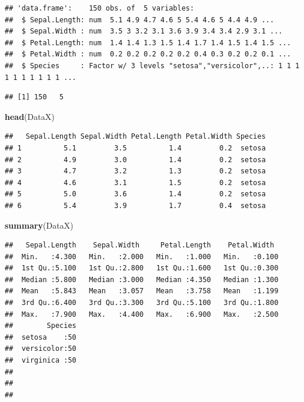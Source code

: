 \documentclass[
]{article}
\newenvironment{Shaded}{\begin{snugshade}}{\end{snugshade}}
\newcommand{\CommentTok}[1]{\textcolor[rgb]{0.56,0.35,0.01}{\textit{#1}}}
\newcommand{\KeywordTok}[1]{\textcolor[rgb]{0.13,0.29,0.53}{\textbf{#1}}}
\newcommand{\NormalTok}[1]{#1}
\begin{document}
\begin{verbatim}
## 'data.frame':    150 obs. of  5 variables:
##  $ Sepal.Length: num  5.1 4.9 4.7 4.6 5 5.4 4.6 5 4.4 4.9 ...
##  $ Sepal.Width : num  3.5 3 3.2 3.1 3.6 3.9 3.4 3.4 2.9 3.1 ...
##  $ Petal.Length: num  1.4 1.4 1.3 1.5 1.4 1.7 1.4 1.5 1.4 1.5 ...
##  $ Petal.Width : num  0.2 0.2 0.2 0.2 0.2 0.4 0.3 0.2 0.2 0.1 ...
##  $ Species     : Factor w/ 3 levels "setosa","versicolor",..: 1 1 1 1 1 1 1 1 1 1 ...
\end{verbatim}

\begin{Shaded}
\end{Shaded}

\begin{verbatim}
## [1] 150   5
\end{verbatim}

\begin{Shaded}
\begin{Highlighting}[]
\KeywordTok{head}\NormalTok{(DataX)}
\end{Highlighting}
\end{Shaded}

\begin{verbatim}
##   Sepal.Length Sepal.Width Petal.Length Petal.Width Species
## 1          5.1         3.5          1.4         0.2  setosa
## 2          4.9         3.0          1.4         0.2  setosa
## 3          4.7         3.2          1.3         0.2  setosa
## 4          4.6         3.1          1.5         0.2  setosa
## 5          5.0         3.6          1.4         0.2  setosa
## 6          5.4         3.9          1.7         0.4  setosa
\end{verbatim}

\begin{Shaded}
\begin{Highlighting}[]
\KeywordTok{summary}\NormalTok{(DataX)}
\end{Highlighting}
\end{Shaded}

\begin{verbatim}
##   Sepal.Length    Sepal.Width     Petal.Length    Petal.Width   
##  Min.   :4.300   Min.   :2.000   Min.   :1.000   Min.   :0.100  
##  1st Qu.:5.100   1st Qu.:2.800   1st Qu.:1.600   1st Qu.:0.300  
##  Median :5.800   Median :3.000   Median :4.350   Median :1.300  
##  Mean   :5.843   Mean   :3.057   Mean   :3.758   Mean   :1.199  
##  3rd Qu.:6.400   3rd Qu.:3.300   3rd Qu.:5.100   3rd Qu.:1.800  
##  Max.   :7.900   Max.   :4.400   Max.   :6.900   Max.   :2.500  
##        Species  
##  setosa    :50  
##  versicolor:50  
##  virginica :50  
##                 
##                 
## 
\end{verbatim}
\end{document}
